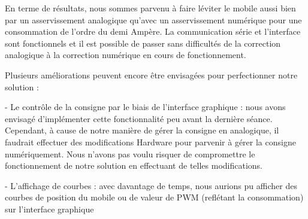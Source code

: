 \documentclass[11pt, french]{article} %
\begin{document}
\medskip

En terme de résultats, nous sommes parvenu à faire léviter le mobile aussi bien par un asservissement analogique qu'avec un asservissement numérique pour une consommation de l'ordre du demi Ampère. La communication série et l'interface sont fonctionnels et il est possible de passer sans difficultés de la correction analogique à la correction numérique en cours de fonctionnement. 

\medskip

Plusieurs améliorations peuvent encore être envisagées pour perfectionner notre solution :

- Le contrôle de la consigne par le biais de l'interface graphique : nous avons envisagé d'implémenter cette fonctionnalité peu avant la dernière séance. Cependant, à cause de notre manière de gérer la consigne en analogique, il faudrait effectuer des modifications Hardware pour parvenir à gérer la consigne numériquement. Nous n'avons pas voulu risquer de compromettre le fonctionnement de notre solution en effectuant de telles modifications. 

- L'affichage de courbes : avec davantage de temps, nous aurions pu afficher des courbes de position du mobile ou de valeur de PWM (reflétant la consommation) sur l'interface graphique
\end{document}
